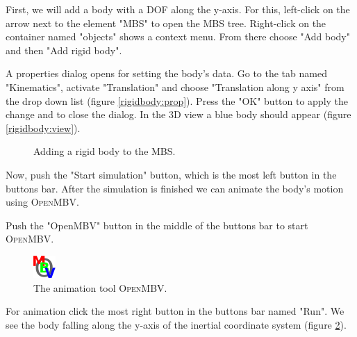 \documentclass[
a4paper,
fleqn,
DIV=15,
pagesize
]{scrartcl}
\begin{document}
First, we will add a body with a DOF along the {\color{green}y-axis}.  For this,
left-click on the arrow next to the element "MBS" to open the MBS tree.
Right-click on the container named "objects" shows a context menu. From there
choose "Add body" and then "Add rigid body".

A properties dialog opens for setting the body's data. Go to the tab named
"Kinematics", activate "Translation" and choose "Translation along y axis" from
the drop down list (figure \ref{rigidbody:prop}). Press the "OK" button to
apply the change and to close the dialog. In the 3D view a blue body should
appear (figure \ref{rigidbody:view}).
\begin{figure}
\centering
{}
\caption{Adding a rigid body to the MBS.} \label{rigidbody}
\end{figure}

Now, push the "Start simulation" button, which is the most left button in the
buttons bar. After the simulation is finished we can animate the body's
motion using \textsc{OpenMBV}.

Push the "OpenMBV" button in the middle of the buttons bar to start
\textsc{OpenMBV}.
\begin{figure}
\centering
\includegraphics[scale=0.4]{openmbv}
\caption{The animation tool \textsc{OpenMBV}.} \label{openmbv}
\end{figure}
For animation click
the most right button in the buttons bar named "Run". We see the body falling
along the {\color{green}y-axis} of the inertial coordinate system (figure
\ref{openmbv}).
  
\end{document}
